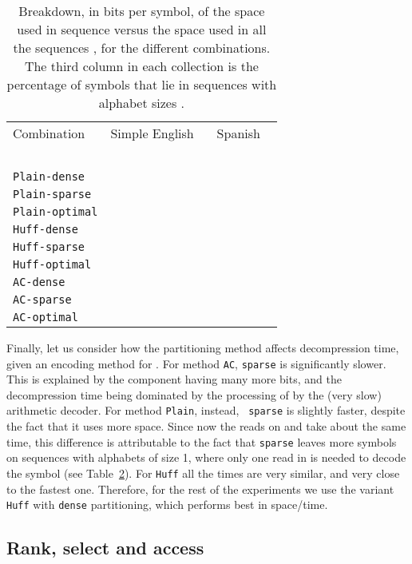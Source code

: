 \documentclass[11pt]{article}
\begin{document}
\begin{table}[t]
{\begin{tabular}
\begin{table}[tb]
\begin{center}
\begin{tabular}{l|rrr|rrr}
Combination & \multicolumn{3}{c|}{Simple English} & \multicolumn{3}{c}{Spanish}  \\
	    & ~~ & ~~ & ~~ & ~~ & ~~ & ~~ \\
\hline
{\tt Plain-dense}    &  &  &  &  &  &  \\
{\tt Plain-sparse}	&  &  &  &  &  &  \\
{\tt Plain-optimal}	&  &  &  &  &  &  \\
{\tt Huff-dense}	  &  &  &  &  &  &  \\
{\tt Huff-sparse}	  &  &  &  &  &  &  \\
{\tt Huff-optimal}	&  &  &  &  &  &  \\
{\tt AC-dense}		  &  &  &  &  &  &  \\
{\tt AC-sparse}		  &  &  &  &  &  &  \\
{\tt AC-optimal}	  &  &  &  &  &  &  \\
\end{tabular}
\caption{Breakdown, in bits per symbol, of the space used in sequence 
versus the space used in all the sequences , for the different
combinations. The third column in each collection is the percentage of symbols
that lie in sequences  with alphabet sizes .}
\label{tab:breakdown}
\end{center}
\end{table}

Finally, let us consider how the partitioning method affects decompression 
time, given an encoding method for . For method {\tt AC}, {\tt sparse} is
significantly slower. This is explained by the  component having many
more bits, and the decompression time being dominated by the processing of 
by the (very slow) arithmetic decoder. For method {\tt Plain}, instead, {\tt 
sparse} is slightly faster, despite the fact that it uses more space. Since now 
the reads on  and  take about the same time, this difference is 
attributable to the fact that {\tt sparse} leaves more symbols on sequences 
 with alphabets of size 1, where only one read in  is needed to 
decode the symbol (see Table~\ref{tab:breakdown}).
For {\tt Huff} all the times are very similar, and very close to the fastest
one. Therefore, for the rest of the experiments we use the variant {\tt Huff}
with {\tt dense} partitioning, which performs best in space/time.

\subsection{Rank, select and access}
\label{sec:exp-seqs}


\end{tabular}}
\end{table}
\end{document}
